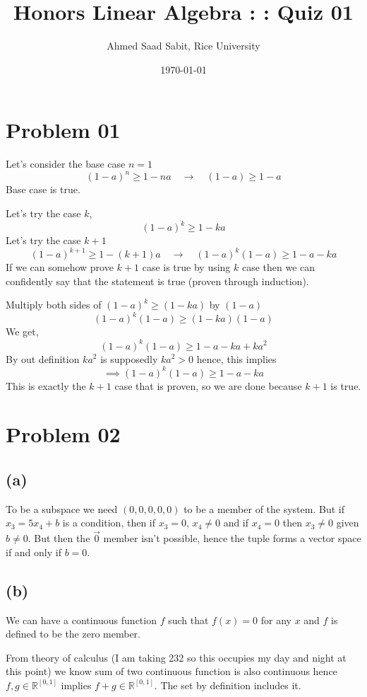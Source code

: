 \documentclass[letter]{article}
\title{Honors Linear Algebra : : Quiz 01}
\author{Ahmed Saad Sabit, Rice University}
\date{\today}
\begin{document}
	\maketitle 

	\section*{Problem 01} 
	Let's consider the base case $n = 1$ 
	\[
		(1-a)^{n} \ge 1-na \quad \rightarrow \quad (1-a) \ge 1 - a
	\]
Base case is true. 

Let's try the case $k$, 
\[
	(1-a)^{k} \ge 1 - ka
\] 
Let's try the case $k+1$ 
\[
	(1-a)^{k+1} \ge 1 - (k+1)a \quad \rightarrow \quad (1-a)^{k} (1-a) \ge 1 - a - ka
 \]
 If we can somehow prove $k+1$ case is true by using $k$ case then we can confidently say that the statement is true (proven through induction). 

 Multiply both sides of $(1-a)^{k} \ge (1 - ka)$ by $(1-a)$ 
 \[
	 (1-a)^{k} (1-a) \ge (1-ka)(1-a)
 \]
 We get, 
 \[
	 (1-a)^{k} (1-a) \ge 1 -a -ka + ka^2
 \]
 By out definition $ka^2$ is supposedly $ka^2 > 0$ hence, this implies
 \[
 \implies (1-a)^{k} (1-a) \ge 1 -a -ka
 \]
 This is exactly the $k+1$ case that is proven, so we are done because $k+1$ is true. 

 \section*{Problem 02} 
 \subsection*{(a)}
 To be a subspace we need $(0,0,0,0,0)$ to be a member of the system. But if $x_3 = 5 x_4 + b$ is a condition, then if $x_3 = 0$, $x_4 \neq  0$ and if $x_4 = 0$ then $x_3 \neq  0$ given $b \neq  0$. But then the $\vec{0}$ member isn't possible, hence the tuple forms a vector space if and only if $b=0$.

 \subsection*{(b)} 
 We can have a continuous function $f$ such that $f(x) = 0$ for any $x$ and $f$ is defined to be the zero member. 

 From theory of calculus (I am taking 232 so this occupies my day and night at this point) we know sum of two continuous function is also continuous hence $f,g \in \mathbb{R}^{[0,1]}$ implies $f+g \in \mathbb{R}^{[0,1]}$. The set by definition includes it. 
\end{document}
